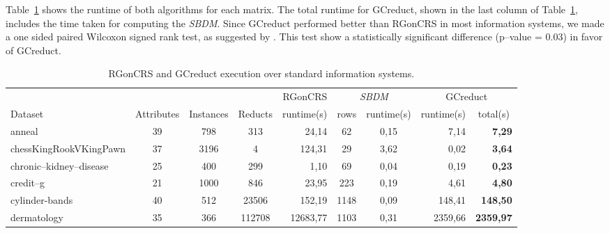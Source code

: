 \documentclass[authoryear,preprint,review,12pt]{elsarticle}
\begin{document}
	Table~\ref{tab:matlab} shows the runtime of both algorithms for each matrix. The total runtime for GCreduct, shown in the last column of Table~\ref{tab:matlab}, includes the time taken for computing the \textit{SBDM}. Since GCreduct performed better than RGonCRS in most information systems, we made a one sided paired Wilcoxon signed rank test, as suggested by \cite{Demsar2006}. This test show a statistically significant difference (p--value = 0.03) in favor of GCreduct.
	
	\begin{table}[!htb]
		\setlength{\tabcolsep}{3pt}
		\caption{RGonCRS and GCreduct execution over standard information systems.}\label{tab:matlab}
		\centering \scriptsize
		\begin{tabular}{|l|c|c|c|r|c|c|r|r|}
			\hline
			&&&& RGonCRS & \multicolumn{2}{c|}{\textit{SBDM}} & \multicolumn{2}{c|}{GCreduct}\\ %
			\cline{6-9}
			Dataset & Attributes & Instances & Reducts & \multicolumn{1}{c|}{runtime(s)} & rows & runtime(s) & \multicolumn{1}{c|}{runtime(s)} & \multicolumn{1}{c|}{total(s)} \\ %
			\hline
			anneal	& 39 & 798 & 313 & 24,14 & 62 & 0,15 & 7,14 & \textbf{7,29} \\ %
			chessKingRookVKingPawn & 37 & 3196 & 4 & 124,31 & 29 & 3,62 & 0,02 & \textbf{3,64}\\ %
			chronic--kidney--disease & 25 & 400 & 299 & 1,10 & 69 & 0,04 & 0,19 & \textbf{0,23} \\ %
			credit--g & 21 & 1000 & 846 & 23,95 & 223 & 0,19 & 4,61 & \textbf{4,80} \\ %
			cylinder-bands & 40 & 512 & 23506 & 152,19 & 1148 & 0,09 & 148,41 & \textbf{148,50}\\ %
			dermatology & 35 & 366 & 112708 & 12683,77 & 1103 & 0,31 & 2359,66 & \textbf{2359,97} \\ %

\end{tabular}
\end{table}
\end{document}
